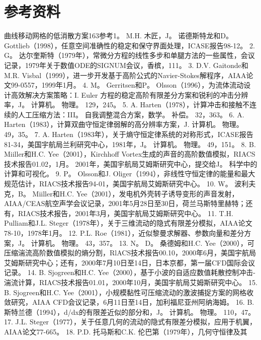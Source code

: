 \documentclass[UTF8,11pt,a4paper,openany,fontset=fandol]{ctexbook}
\begin{document}
\section{参考资料}
曲线移动网格的低消散方案163参考1。 M.H. 木匠，J。 诺德斯特龙和D。 Gottlieb（1998），任意空间准确性的稳定和保守界面处理，ICASE报告98-12。 2. G。 达尔奎斯特（1979年），常微分方程的线性多步和单腿方法的一些属性，会议记录，1979年关于数值ODE的SIGNUM会议，香槟，111。 3. D.V. Gaitonde和M.R. Visbal（1999），进一步开发基于高阶公式的Navier-Stokes解程序，AIAA论文99-0557，1999年1月。 4. M。 Gerritsen和P。 Olsson（1996），为流体流动设计高效解决方案策略：I. Euler 方程的稳定高阶有限差分方案和锐利的冲击分辨率，J。 计算机。 物理。 129，245。 5. A. Harten（1978），计算冲击和接触不连续的人工压缩方法：III。 自我调整混合方案，数学。 补偿。 32，363。 6. A. Harten（1983），计算双曲守恒定律弱解的高分辨率方案，J. 计算机。 物理。 49，35。 7. A. Harten（1983年），关于熵守恒定律系统的对称形式，ICASE报告81-34，美国宇航局兰利研究中心，1981年，J。 计算机。 物理。 49，151。 8. B. Miiller和H.C. Yee（2001），Kirchhoff Vortex生成的声音的高阶数值模拟，RIACS技术报告01.02，1月。 2001年，美国宇航局艾姆斯研究中心，提交给J。 科学中的计算和可视化。 9. P。 Olsson和J. Oliger（1994），非线性守恒定律的能量和最大规范估计，RIACS技术报告94-01，美国宇航局艾姆斯研究中心。 10. W。 波利夫克，B。 Miiller和H.C. Yee（2001），发电机外壳转子诱导变形的声音发射，AIAA/CEAS航空声学会议记录，2001年5月28日至30日，荷兰马斯特里赫特；还有，RIACS技术报告，2001年3月，美国宇航局艾姆斯研究中心。 11. T.H. Pulliam和J.L. Steger（1978年），关于三维流动的隐式有限差分模拟，AIAA论文78-10，1978年1月。 12. P.L. Roe（1981），近似黎曼求解器、参数向量和差分方案，J。 计算机。 物理。 43，357。 13. N。 D。 桑德姆和H.C. Yee（2000），可压缩湍流高阶数值模拟的熵分割，RlACS技术报告00.10，2000年6月，美国宇航局艾姆斯研究中心；还有，2000年7月10日至14日，日本京都，第一届CFD国际会议记录。 14. B. Sjogreen和H.C. Yee（2000），基于小波的自适应数值耗散控制冲击-湍流计算，RIACS技术报告01.01，2000年10月，美国宇航局艾姆斯研究中心。 15. B. Sjogreen和H.C. Yee（2001），小规模黏性可压缩流动的激波捕捉方案的网格收敛研究，AIAA CFD会议记录，6月11日至14日，加利福尼亚州阿纳海姆。 16. B. 斯特兰德（1994），d/dx的有限差近似的部分和，J。 计算机。 物理。 110，47。 17. J.L. Steger（1977），关于任意几何的流动的隐式有限差分模拟，应用于机翼，AIAA论文77-665。 18. P.D. 托马斯和C.K. 伦巴第（1979年），几何守恒律及其
\end{document}

